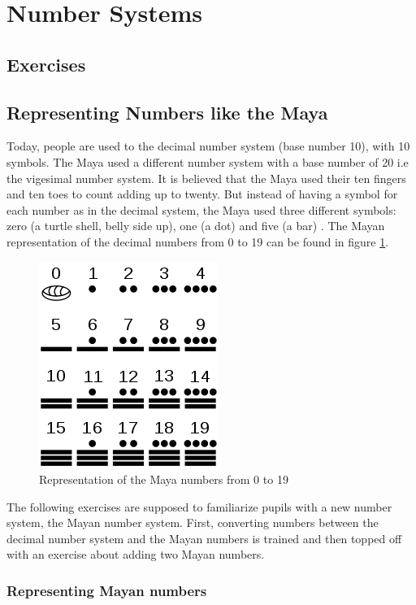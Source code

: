 \section{Number Systems}
\label{section:numberSystems}

\subsection{Exercises}
\subsection*{Representing Numbers like the Maya}

Today, people are used to the decimal number system (base number 10), with 10 symbols. The Maya used a different number system with a base number of 20 i.e the vigesimal number system. It is believed that the Maya used their ten fingers and ten toes to count adding up to twenty. But instead of having a symbol for each number as in the decimal system, the Maya used three different symbols: zero (a turtle shell, belly side up), one (a dot) and five (a bar) \cite{Maya}. The Mayan representation of the decimal numbers from 0 to 19 can be found in figure \ref{fig:maya_numerals}.

\begin{figure} 
    \centering
    \includegraphics[width=0.3 \columnwidth]{figures/maya_number_system.png}
    \caption{Representation of the Maya numbers from 0 to 19} 
    \label{fig:maya_numerals} 
\end{figure}

The following exercises are supposed to familiarize pupils with a new number system, the Mayan number system. First, converting numbers between the decimal number system and the Mayan numbers is trained and then topped off with an exercise about adding two Mayan numbers.

\subsubsection*{Representing Mayan numbers}

